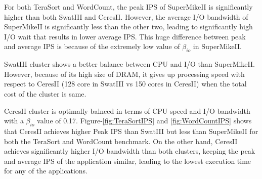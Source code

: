 \documentclass[journal]{IEEEtran}
\begin{document}
For both TeraSort and WordCount, the peak IPS of SuperMikeII is significantly higher than both SwatIII and CeresII. However, the average I/O bandwidth of SuperMikeII is significantly less than the other two, leading to significantly high I/O wait that results in lower average IPS. This huge difference between peak and average IPS is because of the extremely low value of $\beta_{io}$ in SuperMikeII.

SwatIII cluster shows a better balance between CPU and I/O than SuperMikeII. However, because of its high size of DRAM, it gives up processing speed with respect to CeresII (128 core in SwatIII vs 150 cores in CeresII) when the total cost of the cluster is same. 

CeresII cluster is optimally balnced in terms of CPU speed and I/O bandwidth with a $\beta_{io}$ value of 0.17. Figure-\ref{fig:TeraSortIPS} and \ref{fig:WordCountIPS} shows that CeresII achieves higher Peak IPS than SwatIII but less than SuperMikeII for both the TeraSort and WordCount benchmark. On the other hand, CeresII achieves significantly higher I/O bandwidth than both clusters, keeping the peak and average IPS of the application similar, leading to the lowest execution time for any of the applications.
\end{document}

